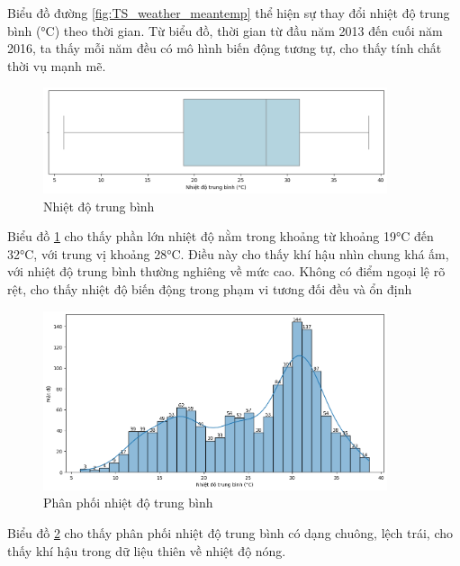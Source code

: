     Biểu đồ đường \ref{fig:TS_weather_meantemp} thể hiện sự thay đổi nhiệt độ trung bình (°C) theo thời gian. Từ biểu đồ, thời gian từ đầu năm 2013 đến cuối năm 2016, ta thấy mỗi năm đều có mô hình biến động tương tự, cho thấy tính chất thời vụ mạnh mẽ.

    \begin{figure}[htp]
        \centering
        \includegraphics[width=0.90\textwidth]{images/TS_weather_boxplot_meantemp.png}
        \caption{Nhiệt độ trung bình}
        \label{fig:TS_weather_boxplot_meantemp}
    \end{figure}
    \FloatBarrier

    Biểu đồ \ref{fig:TS_weather_boxplot_meantemp} cho thấy phần lớn nhiệt độ nằm trong khoảng từ khoảng 19°C đến 32°C, với trung vị khoảng 28°C. Điều này cho thấy khí hậu nhìn chung khá ấm, với nhiệt độ trung bình thường nghiêng về mức cao. Không có điểm ngoại lệ rõ rệt, cho thấy nhiệt độ biến động trong phạm vi tương đối đều và ổn định

    \begin{figure}[htp]
        \centering
        \includegraphics[width=0.90\textwidth]{images/TS_weather_hist_meantemp.png}
        \caption{Phân phối nhiệt độ trung bình}
        \label{fig:TS_weather_hist_meantemp}
    \end{figure}
    \FloatBarrier

     Biểu đồ \ref{fig:TS_weather_hist_meantemp} cho thấy phân phối nhiệt độ trung bình có dạng chuông, lệch trái, cho thấy khí hậu trong dữ liệu thiên về nhiệt độ nóng.

